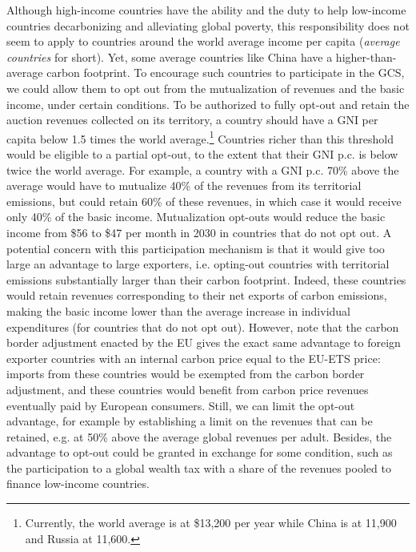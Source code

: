 \documentclass[12pt,english]{article}
\begin{document}
Although high-income countries have the ability and the duty to help low-income countries decarbonizing and alleviating global poverty, this responsibility does not seem to apply to countries around the world average income per capita (\textit{average countries} for short). Yet, some average countries like China have a higher-than-average carbon footprint. To encourage such countries to participate in the GCS, we could allow them to opt out from the mutualization of revenues and the basic income, under certain conditions. To be authorized to fully opt-out and retain the auction revenues collected on its territory, a country should have a GNI per capita below 1.5 times 
the world average.\footnote{Currently, the world average is at \$13,200 per year while China is at 11,900 and Russia at 11,600.} Countries richer than this threshold %
would be eligible to a partial opt-out, to the extent that their GNI p.c. is below twice the world average. For example, a country with a GNI p.c. 70\% above the average would have to mutualize 40\% of the revenues from its territorial emissions, but could retain 60\% of these revenues, in which case it would receive only 40\% of the basic income. Mutualization opt-outs would reduce the basic income from \$56 to \$47 per month in 2030 in countries that do not opt out. 
A potential concern with this participation mechanism is that it would give too large an advantage to large exporters, i.e. opting-out countries with territorial emissions substantially larger than their carbon footprint. Indeed, these countries would retain revenues corresponding to their net exports of carbon emissions, making the basic income lower than the average increase in individual expenditures (for countries that do not opt out). However, note that the carbon border adjustment enacted by the EU gives the exact same advantage to foreign exporter countries with an internal carbon price equal to the EU-ETS price: imports from these countries would be exempted from the carbon border adjustment, and these countries would benefit from carbon price revenues eventually paid by European consumers. Still, we can limit the opt-out advantage, for example by establishing a limit on the revenues that can be retained, e.g. at 50\% above the average global revenues per adult. %
Besides, the advantage to opt-out could be granted in exchange for some condition, such as the participation to a global wealth tax with a share of the revenues pooled to finance low-income countries. %
\end{document}
